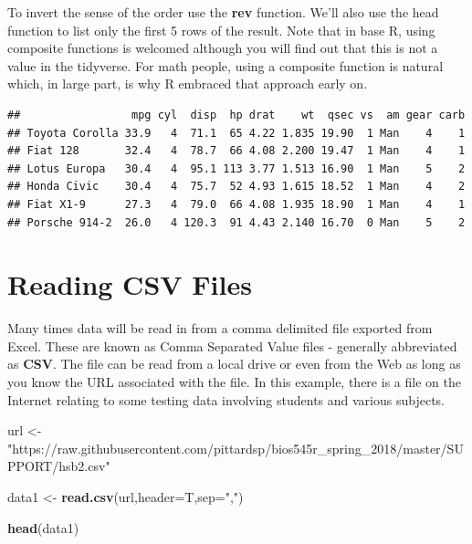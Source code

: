 \documentclass[]{book}
\newenvironment{Shaded}{\begin{snugshade}}{\end{snugshade}}
\newcommand{\DataTypeTok}[1]{\textcolor[rgb]{0.13,0.29,0.53}{#1}}
\newcommand{\KeywordTok}[1]{\textcolor[rgb]{0.13,0.29,0.53}{\textbf{#1}}}
\newcommand{\NormalTok}[1]{#1}
\newcommand{\OperatorTok}[1]{\textcolor[rgb]{0.81,0.36,0.00}{\textbf{#1}}}
\newcommand{\StringTok}[1]{\textcolor[rgb]{0.31,0.60,0.02}{#1}}
\begin{document}
To invert the sense of the order use the \textbf{rev} function. We'll also use the head function to list only the first 5 rows of the result. Note that in base R, using composite functions is welcomed although you will find out that this is not a value in the tidyverse. For math people, using a composite function is natural which, in large part, is why R embraced that approach early on.

\begin{Shaded}
\end{Shaded}

\begin{verbatim}
##                 mpg cyl  disp  hp drat    wt  qsec vs  am gear carb
## Toyota Corolla 33.9   4  71.1  65 4.22 1.835 19.90  1 Man    4    1
## Fiat 128       32.4   4  78.7  66 4.08 2.200 19.47  1 Man    4    1
## Lotus Europa   30.4   4  95.1 113 3.77 1.513 16.90  1 Man    5    2
## Honda Civic    30.4   4  75.7  52 4.93 1.615 18.52  1 Man    4    2
## Fiat X1-9      27.3   4  79.0  66 4.08 1.935 18.90  1 Man    4    1
## Porsche 914-2  26.0   4 120.3  91 4.43 2.140 16.70  0 Man    5    2
\end{verbatim}

\hypertarget{reading-csv-files}{%
\section{Reading CSV Files}\label{reading-csv-files}}

Many times data will be read in from a comma delimited file exported from Excel. These are known as Comma Separated Value files - generally abbreviated as \textbf{CSV}. The file can be read from a local drive or even from the Web as long as you know the URL associated with the file. In this example, there is a file on the Internet relating to some testing data involving students and various subjects.

\begin{Shaded}
\begin{Highlighting}[]
\NormalTok{url <-}\StringTok{ "https://raw.githubusercontent.com/pittardsp/bios545r_spring_2018/master/SUPPORT/hsb2.csv"}

\NormalTok{data1 <-}\StringTok{ }\KeywordTok{read.csv}\NormalTok{(url,}\DataTypeTok{header=}\NormalTok{T,}\DataTypeTok{sep=}\StringTok{","}\NormalTok{)}

\KeywordTok{head}\NormalTok{(data1)}
\end{Highlighting}
\end{Shaded}
\end{document}
